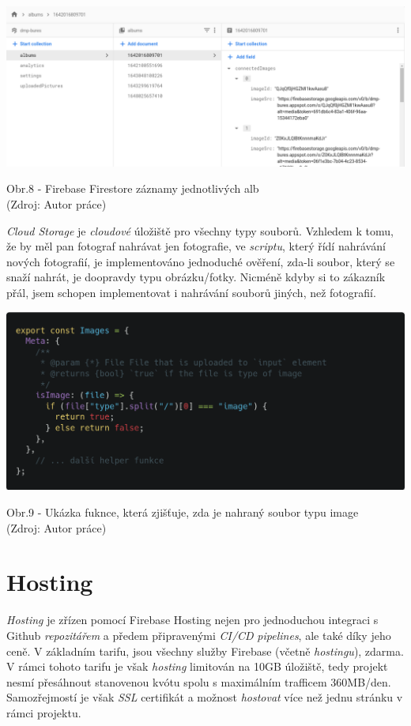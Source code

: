 \documentclass[12pt,a4paper]{report}
\begin{document}
  \vspace*{0.5cm}
  \noindent\includegraphics[width=\linewidth]{firestore.png}
  \begin{center}
    Obr.8 - Firebase Firestore záznamy jednotlivých alb \\
    (Zdroj: Autor práce)
  \end{center}
  \vspace*{0.5cm}

  \emph{Cloud Storage} je \emph{cloudové} úložiště pro všechny typy souborů. Vzhledem k tomu, že by měl pan
  fotograf nahrávat jen fotografie, ve \emph{scriptu}, který řídí nahrávání nových fotografií, je
  implementováno jednoduché ověření, zda-li soubor, který se snaží nahrát, je doopravdy typu
  obrázku/fotky. Nicméně kdyby si to zákazník přál, jsem schopen implementovat i nahrávání
  souborů jiných, než fotografií.

  \vspace*{0.5cm}
  \noindent\includegraphics[width=\linewidth]{imagesHelperCodeblock.png}
  \begin{center}
    Obr.9 - Ukázka fuknce, která zjišťuje, zda je nahraný soubor typu image \\
    (Zdroj: Autor práce)
  \end{center}
  \vspace*{0.5cm}

  \section{Hosting}
  \emph{Hosting} je zřízen pomocí Firebase Hosting nejen pro jednoduchou integraci s Github \emph{repozitářem}
  a předem připravenými \emph{CI/CD} \emph{pipelines}, ale také díky jeho ceně. V základním tarifu, jsou všechny služby
  Firebase (včetně \emph{hostingu}), zdarma. V rámci tohoto tarifu je však \emph{hosting} limitován na 10GB úložiště, tedy projekt 
  nesmí přesáhnout stanovenou kvótu spolu s maximálním trafficem 360MB/den. Samozřejmostí je však \emph{SSL} certifikát a možnost
  \emph{hostovat} více než jednu stránku v rámci projektu.
\end{document}

